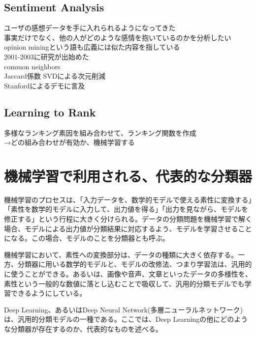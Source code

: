 \subsection{Sentiment Analysis}
ユーザの感想データを手に入れられるようになってきた\\
事実だけでなく、他の人がどのような感情を抱いているのかを分析したい\\
opinion miningという語も広義には似た内容を指している\\
2001-2003に研究が出始めた\\
common neighbors\\
Jaccard係数 SVDによる次元削減\\
Stanfordによるデモに言及

\subsection{Learning to Rank}
多様なランキング素因を組み合わせて、ランキング関数を作成\\
→どの組み合わせが有効か、機械学習する

\section{機械学習で利用される、代表的な分類器}
機械学習のプロセスは、「入力データを、数学的モデルで使える素性に変換する」「素性を数学的モデルに入力して、出力値を得る」「出力を見ながら、モデルを修正する」という行程に大きく分けられる。データの分類問題を機械学習で解く場合、モデルによる出力値が分類結果に対応するよう、モデルを学習させることになる。この場合、モデルのことを分類器とも呼ぶ。\par
機械学習において、素性への変換部分は、データの種類に大きく依存する。一方、分類器に用いる数学的モデルと、モデルの改修法、つまり学習法は、汎用的に使うことができる。あるいは、画像や音声、文章といったデータの多様性を、素性という一般的な数値に落とし込むことで吸収して、汎用的分類モデルでも学習できるようにしている。\par
Deep Learning、あるいはDeep Neural Network(多層ニューラルネットワーク)は、汎用的分類モデルの一種である。ここでは、Deep Learningの他にどのような分類器が存在するのか、代表的なものを述べる。


